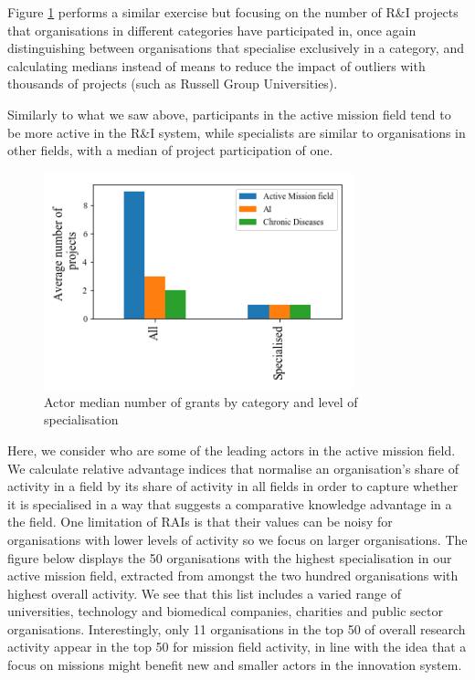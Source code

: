\documentclass[11pt]{article}
\begin{document}
Figure \ref{fig:actor_projs} performs a similar exercise but focusing on the number of R\&I projects that organisations in different categories have participated in, once again distinguishing between organisations that specialise exclusively in a category, and calculating medians instead of means to reduce the impact of outliers with thousands of projects (such as Russell Group Universities). 

Similarly to what we saw above, participants in the active mission field tend to be more active in the R&I system, while specialists are similar to organisations in other fields, with a median of project participation of one.

\begin{figure}[!ht]
    \centering
    \includegraphics[width=0.8\textwidth]{figures/fig_14_actor_projects.png}
    \caption{Actor median number of grants by category and level of specialisation}
    \label{fig:actor_projs}
\end{figure}

Here, we consider who are some of the leading actors in the active mission field. We calculate relative advantage indices that normalise an organisation’s share of activity in a field by its share of activity in all fields in order to capture whether it is specialised in a way that suggests a comparative knowledge advantage in a the field. One limitation of RAIs is that their values can be noisy for organisations with lower levels of activity so we focus on larger organisations. The figure below displays the 50 organisations with the highest specialisation in our active mission field, extracted from amongst the two hundred organisations with highest overall activity. We see that this list includes a varied range of universities, technology and biomedical companies, charities and public sector organisations. Interestingly, only 11 organisations in the top 50 of overall research activity appear in the top 50 for mission field activity, in line with the idea that a focus on missions might benefit new and smaller actors in the innovation system.
\end{document}
